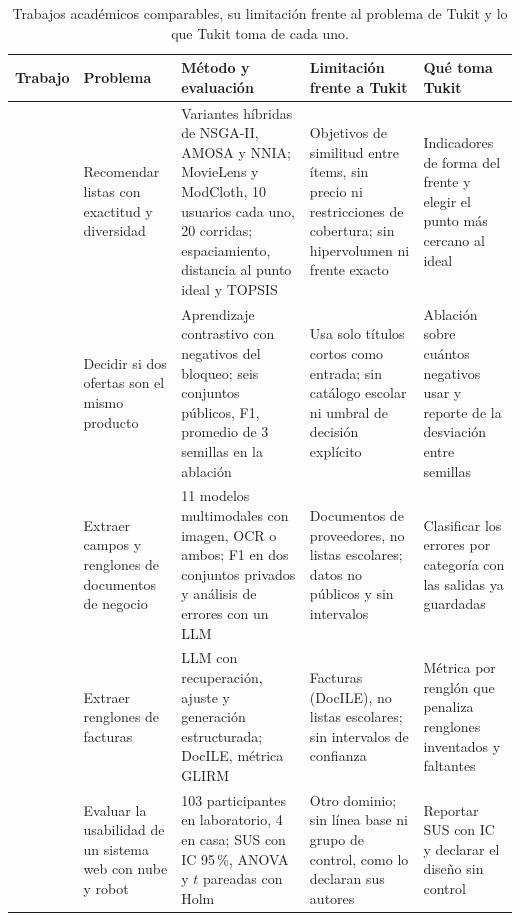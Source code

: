 \begin{table}[htbp]
\centering
\footnotesize
\caption{Trabajos académicos comparables, su limitación frente al problema de Tukit y lo que Tukit toma de cada uno.}
\label{tab:trabajo-academico}
\begin{tabularx}{\textwidth}{@{}p{2.3cm}p{2.2cm}XXX@{}}
\toprule
Trabajo & Problema & Método y evaluación & Limitación frente a Tukit & Qué toma Tukit \\
\midrule
\citet{lotfian_himars_2026} & Recomendar listas con exactitud y diversidad & Variantes híbridas de NSGA-II, AMOSA y NNIA; MovieLens y ModCloth, 10 usuarios cada uno, 20 corridas; espaciamiento, distancia al punto ideal y TOPSIS & Objetivos de similitud entre ítems, sin precio ni restricciones de cobertura; sin hipervolumen ni frente exacto & Indicadores de forma del frente y elegir el punto más cercano al ideal \\
\citet{almagro_blocking_2022} & Decidir si dos ofertas son el mismo producto & Aprendizaje contrastivo con negativos del bloqueo; seis conjuntos públicos, F1, promedio de 3 semillas en la ablación & Usa solo títulos cortos como entrada; sin catálogo escolar ni umbral de decisión explícito & Ablación sobre cuántos negativos usar y reporte de la desviación entre semillas \\
\citet{shen_ocr_2026} & Extraer campos y renglones de documentos de negocio & 11 modelos multimodales con imagen, OCR o ambos; F1 en dos conjuntos privados y análisis de errores con un LLM & Documentos de proveedores, no listas escolares; datos no públicos y sin intervalos & Clasificar los errores por categoría con las salidas ya guardadas \\
\citet{cesista_retrieval_2024} & Extraer renglones de facturas & LLM con recuperación, ajuste y generación estructurada; DocILE, métrica GLIRM & Facturas (DocILE), no listas escolares; sin intervalos de confianza & Métrica por renglón que penaliza renglones inventados y faltantes \\
\citet{kian_dart_2026} & Evaluar la usabilidad de un sistema web con nube y robot & 103 participantes en laboratorio, 4 en casa; SUS con IC 95\,\%, ANOVA y $t$ pareadas con Holm & Otro dominio; sin línea base ni grupo de control, como lo declaran sus autores & Reportar SUS con IC y declarar el diseño sin control \\
\bottomrule
\end{tabularx}
\end{table}
